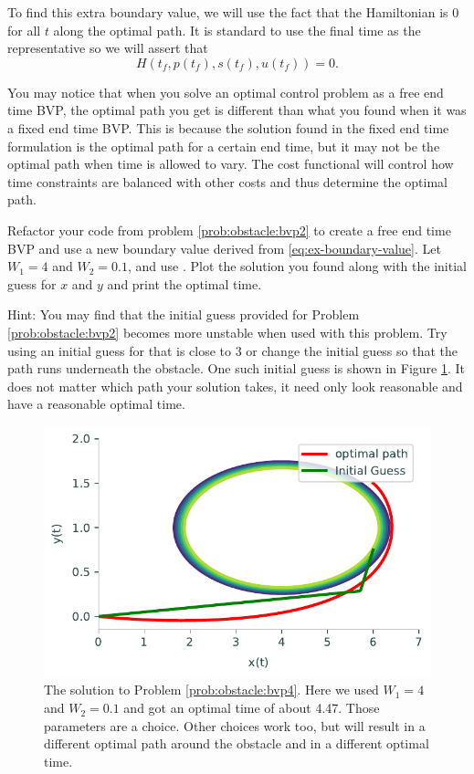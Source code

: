 To find this extra boundary value, we will use the fact that the Hamiltonian is 0 for all $t$ along the optimal path. It is standard to use the final time as the representative so we will assert that
\begin{equation}\label{eq:ex-boundary-value}
    H(t_f,p(t_f),s(t_f),u(t_f)) = 0.
\end{equation}

You may notice that when you solve an optimal control problem as a free end time BVP, the optimal path you get is different than what you found when it was a fixed end time BVP.
This is because the solution found in the fixed end time formulation is the optimal path for a certain end time, but it may not be the optimal path when time is allowed to vary.
The cost functional will control how time constraints are balanced with other costs and thus determine the optimal path.

\begin{problem}
\label{prob:obstacle:bvp4}
Refactor your code from problem \ref{prob:obstacle:bvp2} to create a free end time BVP and use a new boundary value derived from \ref{eq:ex-boundary-value}.
Let $W_1 = 4$ and $W_2 = 0.1$, and use .
Plot the solution you found along with the initial guess for $x$ and $y$ and print the optimal time.

Hint: You may find that the initial guess provided for Problem \ref{prob:obstacle:bvp2} becomes more unstable when used with this problem.
Try using an initial guess for  that is close to $3$ or change the initial guess  so that the path runs underneath the obstacle.
One such initial guess is shown in Figure \ref{fig:OA_prob4}. It does not matter which path your solution takes, it need only look reasonable and have a reasonable optimal time.
\end{problem}

\begin{figure}[H]
    \centering
    \includegraphics[width=5.75in]{figures/OA_prob4.pdf}
    \caption{The solution to Problem \ref{prob:obstacle:bvp4}.  Here we used $W_1 = 4$ and $W_2 = 0.1$ and got an optimal time of about 4.47.  Those parameters are a choice.  Other choices work too, but will result in a different optimal path around the obstacle and in a different optimal time.}
    \label{fig:OA_prob4}
\end{figure}
